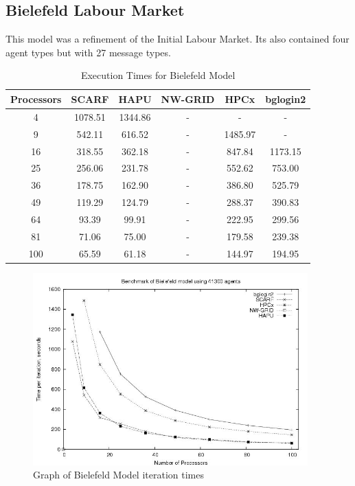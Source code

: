 \subsection{Bielefeld Labour Market}
This model was a refinement of the Initial Labour Market. Its also contained four agent types but with 27 message types.
{
\renewcommand{\arraystretch}{1.25}
\begin{table}[ht]
 \centering
  \begin{tabular}{c|ccccc}
 Processors &SCARF &HAPU  &NW-GRID &HPCx   &bglogin2 \\ \hline
4 &1078.51 &1344.86 &- &- &-    \\
9 &542.11 &616.52 &- &1485.97 &-        \\
16 &318.55 &362.18 &- &847.84 &1173.15  \\
25 &256.06 &231.78 &- &552.62 &753.00   \\
36 &178.75 &162.90 &- &386.80 &525.79   \\
49 &119.29 &124.79 &- &288.37 &390.83   \\
64 &93.39 &99.91 &- &222.95 &299.56     \\
81 &71.06 &75.00 &- &179.58 &239.38     \\
100 &65.59 &61.18 &- &144.97 &194.95    \\

 \end{tabular}
 \caption{Execution Times for Bielefeld Model}
 \label{tab:ExecutionTimesForBielefeld}
\end{table}
}
\bigskip
\begin{figure}[ht]
 \centering
  \includegraphics[width=300pt]{Bielefeld2-graph.jpg}
 \caption{Graph of Bielefeld Model iteration times}
 \label{fig:Labour-graph2}
\end{figure}

